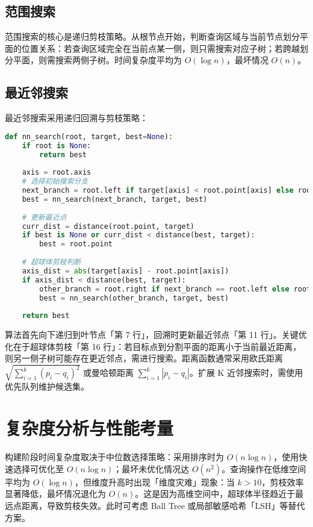 \section{范围搜索}
范围搜索的核心是递归剪枝策略。从根节点开始，判断查询区域与当前节点划分平面的位置关系：若查询区域完全在当前点某一侧，则只需搜索对应子树；若跨越划分平面，则需搜索两侧子树。时间复杂度平均为 $O(\log n)$，最坏情况 $O(n)$。\par
\section{最近邻搜索}
最近邻搜索采用递归回溯与剪枝策略：\par
\begin{lstlisting}[language=python]
def nn_search(root, target, best=None):
    if root is None:
        return best
        
    axis = root.axis
    # 选择初始搜索分支
    next_branch = root.left if target[axis] < root.point[axis] else root.right
    best = nn_search(next_branch, target, best)
    
    # 更新最近点
    curr_dist = distance(root.point, target)
    if best is None or curr_dist < distance(best, target):
        best = root.point
        
    # 超球体剪枝判断
    axis_dist = abs(target[axis] - root.point[axis])
    if axis_dist < distance(best, target):
        other_branch = root.right if next_branch == root.left else root.left
        best = nn_search(other_branch, target, best)
        
    return best
\end{lstlisting}
算法首先向下递归到叶节点「第 7 行」，回溯时更新最近邻点「第 11 行」。关键优化在于超球体剪枝「第 16 行」：若目标点到分割平面的距离小于当前最近距离，则另一侧子树可能存在更近邻点，需进行搜索。距离函数通常采用欧氏距离 $\sqrt{\sum_{i=1}^{k}(p_i-q_i)^2}$ 或曼哈顿距离 $\sum_{i=1}^{k}|p_i-q_i|$。扩展 K 近邻搜索时，需使用优先队列维护候选集。\par
\chapter{复杂度分析与性能考量}
构建阶段时间复杂度取决于中位数选择策略：采用排序时为 $O(n \log n)$，使用快速选择可优化至 $O(n \log n)$；最坏未优化情况达 $O(n^2)$。查询操作在低维空间平均为 $O(\log n)$，但维度升高时出现「维度灾难」现象：当 $k > 10$，剪枝效率显著降低，最坏情况退化为 $O(n)$。这是因为高维空间中，超球体半径趋近于最远点距离，导致剪枝失效。此时可考虑 Ball Tree 或局部敏感哈希「LSH」等替代方案。\par
